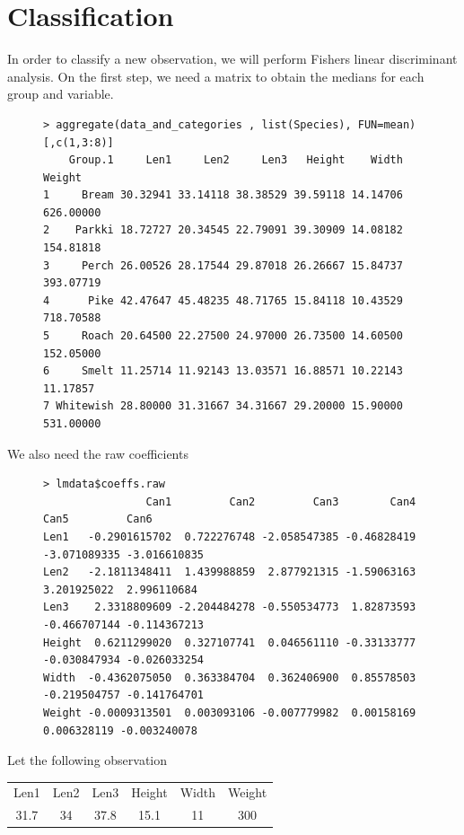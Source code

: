 \documentclass[openany]{article}
\begin{document}
	\section{Classification}
		In order to classify a new observation, we will perform Fishers linear discriminant analysis. On the first step, we need a matrix to obtain the medians 
		for each group and variable. 
		\begin{figure}[H]
			\iftrue
			\begin{lstlisting}[style=myScalastyle]
> aggregate(data_and_categories , list(Species), FUN=mean) [,c(1,3:8)]
    Group.1     Len1     Len2     Len3   Height    Width    Weight
1     Bream 30.32941 33.14118 38.38529 39.59118 14.14706 626.00000
2    Parkki 18.72727 20.34545 22.79091 39.30909 14.08182 154.81818
3     Perch 26.00526 28.17544 29.87018 26.26667 15.84737 393.07719
4      Pike 42.47647 45.48235 48.71765 15.84118 10.43529 718.70588
5     Roach 20.64500 22.27500 24.97000 26.73500 14.60500 152.05000
6     Smelt 11.25714 11.92143 13.03571 16.88571 10.22143  11.17857
7 Whitewish 28.80000 31.31667 34.31667 29.20000 15.90000 531.00000
			\end{lstlisting}
			\fi
		\end{figure}
		We also need the raw coefficients
		\begin{figure}[H]
			\iftrue
			\begin{lstlisting}[style=myScalastyle]
> lmdata$coeffs.raw
                Can1         Can2         Can3        Can4         Can5         Can6
Len1   -0.2901615702  0.722276748 -2.058547385 -0.46828419 -3.071089335 -3.016610835
Len2   -2.1811348411  1.439988859  2.877921315 -1.59063163  3.201925022  2.996110684
Len3    2.3318809609 -2.204484278 -0.550534773  1.82873593 -0.466707144 -0.114367213
Height  0.6211299020  0.327107741  0.046561110 -0.33133777 -0.030847934 -0.026033254
Width  -0.4362075050  0.363384704  0.362406900  0.85578503 -0.219504757 -0.141764701
Weight -0.0009313501  0.003093106 -0.007779982  0.00158169  0.006328119 -0.003240078			
			\end{lstlisting}
			\fi
		\end{figure}
		Let the following observation
		\begin{center}
			
			\begin{tabular}{ c c c c c c }
				Len1  &   Len2  &   Len3 &  Height  &  Width  &  Weight \\
				31.7  &   34    &   37.8 &  15.1    & 11      &  300
				
			\end{tabular}
		\end{center}
\end{document}
